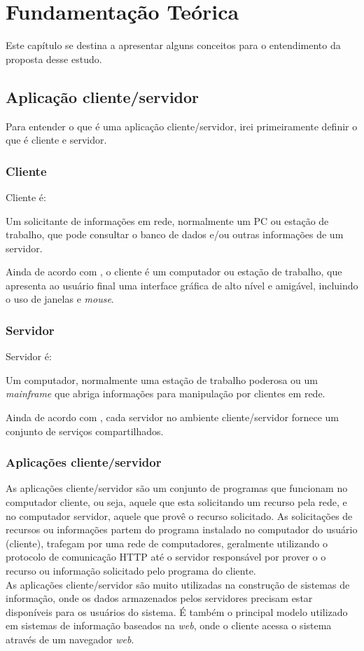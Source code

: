 \chapter{Fundamentação Teórica}\label{cap:fundamentacao-teorica}
Este capítulo se destina a apresentar alguns conceitos para o entendimento da 
proposta desse estudo.
\section{Aplicação cliente/servidor}
Para entender o que é uma aplicação cliente/servidor, irei primeiramente definir o que é cliente e servidor.
\subsection{Cliente}
Cliente é:
\begin{citacao}
Um solicitante de informações em rede, normalmente um PC ou estação de trabalho, que pode consultar o banco de dados e/ou outras informações de um servidor. \cite{stallings2005}
\end{citacao}
Ainda de acordo com , o cliente é um computador ou estação de trabalho, que apresenta ao usuário final uma interface gráfica de alto nível e amigável, incluindo o uso de janelas e \textit{mouse}. 
\subsection{Servidor}
Servidor é:
\begin{citacao}
Um computador, normalmente uma estação de trabalho poderosa ou um \textit{mainframe} que abriga informações para manipulação por clientes em rede. \cite{stallings2005}
\end{citacao}
Ainda de acordo com , cada servidor no ambiente cliente/servidor fornece um conjunto de serviços compartilhados.
\subsection{Aplicações cliente/servidor}
As aplicações cliente/servidor são um conjunto de programas que funcionam no computador cliente, ou seja, aquele que esta solicitando um recurso pela rede, e no computador servidor, aquele que provê o recurso solicitado. As solicitações de recursos ou informações partem do programa instalado no computador do usuário (cliente), trafegam por uma rede de computadores, geralmente utilizando o protocolo de comunicação HTTP até o servidor responsável por prover o o recurso ou informação solicitado pelo programa do cliente.\\
As aplicações cliente/servidor são muito utilizadas na construção de sistemas de informação, onde os dados armazenados pelos servidores precisam estar disponíveis para os usuários do sistema. É também o principal modelo utilizado em sistemas de informação baseados na \textit{web}, onde o cliente acessa o sistema através de um navegador \textit{web}.
